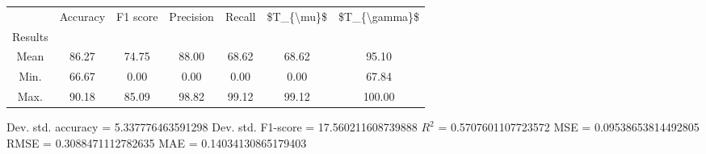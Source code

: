 \begin{tabular}{|c|c|c|c|c|c|c|}
\toprule
{} &  Accuracy &  F1 score &  Precision &  Recall &  \$T\_\{\textbackslash mu\}\$ &  \$T\_\{\textbackslash gamma\}\$ \\
Results &           &           &            &         &            &               \\
\hline
Mean    &     86.27 &     74.75 &      88.00 &   68.62 &      68.62 &         95.10 \\
Min.    &     66.67 &      0.00 &       0.00 &    0.00 &       0.00 &         67.84 \\
Max.    &     90.18 &     85.09 &      98.82 &   99.12 &      99.12 &        100.00 \\
\bottomrule
\end{tabular}

 Dev. std. accuracy = 5.337776463591298
 Dev. std. F1-score = 17.560211608739888
 $R^2$ = 0.5707601107723572
 MSE = 0.09538653814492805
 RMSE = 0.3088471112782635
 MAE = 0.14034130865179403